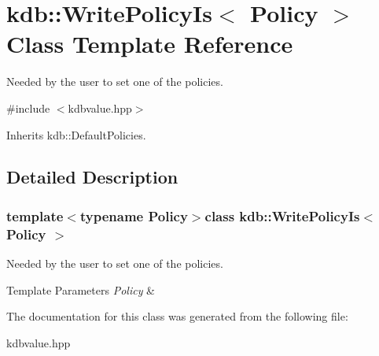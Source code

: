 \hypertarget{classkdb_1_1WritePolicyIs}{\section{kdb\-:\-:Write\-Policy\-Is$<$ Policy $>$ Class Template Reference}
\label{classkdb_1_1WritePolicyIs}
}


Needed by the user to set one of the policies.  




{\ttfamily \#include $<$kdbvalue.\-hpp$>$}



Inherits kdb\-::\-Default\-Policies.



\subsection{Detailed Description}
\subsubsection*{template$<$typename Policy$>$class kdb\-::\-Write\-Policy\-Is$<$ Policy $>$}

Needed by the user to set one of the policies. 


\begin{DoxyTemplParams}{Template Parameters}
{\em Policy} & \\
\hline
\end{DoxyTemplParams}


The documentation for this class was generated from the following file\-:\begin{DoxyCompactItemize}
\item 
kdbvalue.\-hpp\end{DoxyCompactItemize}
